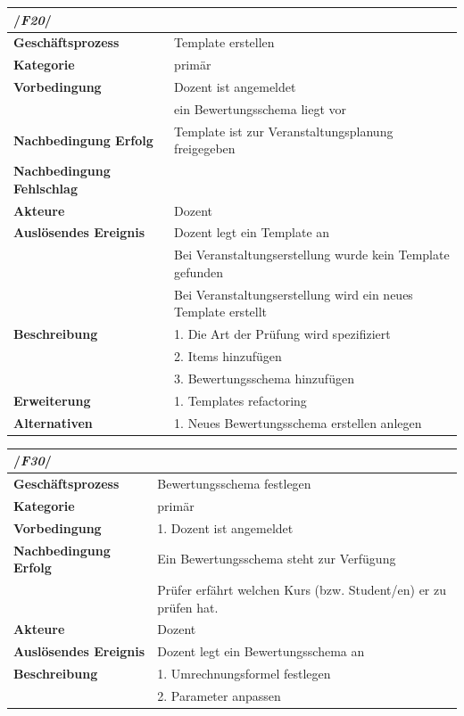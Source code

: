 		\begin{table}[ht]
		\begin{tabular}{ll}
			\multicolumn{2}{l}{/\textbf{\textit{F20}}/}\\\hline
			 \textbf{Geschäftsprozess} & Template erstellen \\ 
			 \textbf{Kategorie} & primär \\ 
			 \textbf{Vorbedingung} & Dozent ist angemeldet\\
			 & ein Bewertungsschema liegt vor \\ 

			 \textbf{Nachbedingung Erfolg} & Template ist
			  zur Veranstaltungsplanung freigegeben  \\ 
			 \textbf{Nachbedingung Fehlschlag} &  \\ 
			 \textbf{Akteure} & Dozent \\ 
			 \textbf{Auslösendes Ereignis} & Dozent legt ein Template an \\
			 & Bei Veranstaltungserstellung wurde kein Template gefunden\\
			 & Bei Veranstaltungserstellung wird ein neues Template erstellt\\
			 \textbf{Beschreibung} & 1. Die Art der Prüfung wird spezifiziert \\
			 & 2. Items hinzufügen\\
			 & 3. Bewertungsschema hinzufügen\\
			  \textbf{Erweiterung} & 1. Templates refactoring \\ 
			 \textbf{Alternativen} & 1. Neues Bewertungsschema erstellen anlegen \\  			
			 \end{tabular} 
		\label{tab:F20}
		\end{table}
	
		\begin{table}[ht]
		\begin{tabular}{ll}
			\multicolumn{2}{l}{/\textbf{\textit{F30}}/}\\\hline
			 \textbf{Geschäftsprozess} & Bewertungsschema festlegen \\ 
			 \textbf{Kategorie} & primär \\ 
			 \textbf{Vorbedingung} & 1. Dozent ist angemeldet  \\ 
			 \textbf{Nachbedingung Erfolg} & Ein Bewertungsschema steht zur Verfügung\\ 
			 & Prüfer erfährt welchen Kurs (bzw.  Student/en) er zu prüfen hat.\\
			 \textbf{Akteure} & Dozent \\ 
			 \textbf{Auslösendes Ereignis} & Dozent legt ein Bewertungsschema an  \\ 
			 \textbf{Beschreibung} &  1. Umrechnungsformel festlegen\\
			 & 2. Parameter anpassen
			 \end{tabular} 
		\label{tab:F30}
		\end{table}
	
